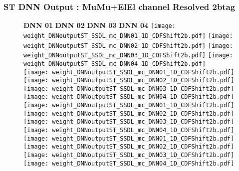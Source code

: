 \documentclass[9pt]{beamer}
\begin{document}
\begin{frame}
	\frametitle{ST DNN Output : MuMu+ElEl channel Resolved 2btag}
	\begin{figure}
	    \textbf{DNN 01} \hspace{1.2cm} \textbf{DNN 02} \hspace{1.2cm} \textbf{DNN 03} \hspace{1.2cm} \textbf{DNN 04}
        \centering
		\texttt{[image: weight\_DNNoutputST\_SSDL\_mc\_DNN01\_1D\_CDFShift2b.pdf]}
		\texttt{[image: weight\_DNNoutputST\_SSDL\_mc\_DNN02\_1D\_CDFShift2b.pdf]}
		\texttt{[image: weight\_DNNoutputST\_SSDL\_mc\_DNN03\_1D\_CDFShift2b.pdf]}
		\texttt{[image: weight\_DNNoutputST\_SSDL\_mc\_DNN04\_1D\_CDFShift2b.pdf]}\\
		\texttt{[image: weight\_DNNoutputST\_SSDL\_mc\_DNN01\_1D\_CDFShift2b.pdf]}
		\texttt{[image: weight\_DNNoutputST\_SSDL\_mc\_DNN02\_1D\_CDFShift2b.pdf]}
		\texttt{[image: weight\_DNNoutputST\_SSDL\_mc\_DNN03\_1D\_CDFShift2b.pdf]}
		\texttt{[image: weight\_DNNoutputST\_SSDL\_mc\_DNN04\_1D\_CDFShift2b.pdf]}\\
		\texttt{[image: weight\_DNNoutputST\_SSDL\_mc\_DNN01\_1D\_CDFShift2b.pdf]}
		\texttt{[image: weight\_DNNoutputST\_SSDL\_mc\_DNN02\_1D\_CDFShift2b.pdf]}
		\texttt{[image: weight\_DNNoutputST\_SSDL\_mc\_DNN03\_1D\_CDFShift2b.pdf]}
		\texttt{[image: weight\_DNNoutputST\_SSDL\_mc\_DNN04\_1D\_CDFShift2b.pdf]}\\
		\texttt{[image: weight\_DNNoutputST\_SSDL\_mc\_DNN01\_1D\_CDFShift2b.pdf]}
		\texttt{[image: weight\_DNNoutputST\_SSDL\_mc\_DNN02\_1D\_CDFShift2b.pdf]}
		\texttt{[image: weight\_DNNoutputST\_SSDL\_mc\_DNN03\_1D\_CDFShift2b.pdf]}
		\texttt{[image: weight\_DNNoutputST\_SSDL\_mc\_DNN04\_1D\_CDFShift2b.pdf]}\\
	\end{figure}
\end{frame}
\end{document}
